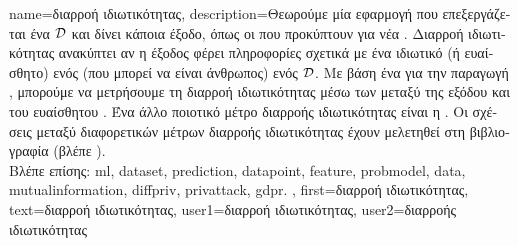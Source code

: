 {name={\foreignlanguage{greek}{διαρροή ιδιωτικότητας}},
	description={\foreignlanguage{greek}{Θεωρούμε μία εφαρμογή} 
		 \foreignlanguage{greek}{που επεξεργάζεται ένα} 
		 $\mathcal{D}$ \foreignlanguage{greek}{και δίνει κάποια έξοδο, όπως οι}  
		\foreignlanguage{greek}{που προκύπτουν για νέα} . \foreignlanguage{greek}{Διαρροή ιδιωτικότητας ανακύπτει 
		αν η έξοδος φέρει πληροφορίες σχετικά με ένα ιδιωτικό (ή ευαίσθητο)}  \foreignlanguage{greek}{ενός} 
		 \foreignlanguage{greek}{(που μπορεί να είναι άνθρωπος) ενός $\mathcal{D}$. Με βάση ένα}  
		\foreignlanguage{greek}{για την παραγωγή} , \foreignlanguage{greek}{μπορούμε να μετρήσουμε τη διαρροή ιδιωτικότητας 
		μέσω των}  \foreignlanguage{greek}{μεταξύ της εξόδου και του ευαίσθητου} 
		. \foreignlanguage{greek}{Ένα άλλο ποιοτικό μέτρο διαρροής ιδιωτικότητας είναι η}  
		. \foreignlanguage{greek}{Οι σχέσεις μεταξύ διαφορετικών μέτρων διαρροής ιδιωτικότητας έχουν μελετηθεί  
		στη βιβλιογραφία (βλέπε} \cite{InfThDiffPriv}).\\
		\foreignlanguage{greek}{Βλέπε επίσης:} \gls{ml}, \gls{dataset}, \gls{prediction}, \gls{datapoint}, \gls{feature}, \gls{probmodel}, \gls{data}, 
		\gls{mutualinformation}, \gls{diffpriv}, \gls{privattack}, \gls{gdpr}. }, 
	first={\foreignlanguage{greek}{διαρροή ιδιωτικότητας}}, 
	text={\foreignlanguage{greek}{διαρροή ιδιωτικότητας}},
	user1={\foreignlanguage{greek}{διαρροή ιδιωτικότητας}}, %
   	user2={\foreignlanguage{greek}{διαρροής ιδιωτικότητας}} %
}

